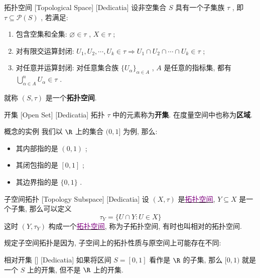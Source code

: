 \documentclass[UTF8]{ctexart}
\newcommand{\hyperrefc}[2]{\hyperref[#1]{\textcolor{purple}{#2}}}
\begin{document}
\begin{dfn}
    [TopologicalSpace]
    {拓扑空间}
    [Topological Space]
    [Dedicatia]
    设非空集合 \( S \) 具有一个子集族 \( \tau \) , 即 \( \tau\subseteq\mathcal{P}(S)  \) , 若满足: 
    \begin{enumerate}
        \item 包含空集和全集:  \( \varnothing\in\tau \) ,  \( X\in\tau \) ;
        \item 对有限交运算封闭:  \( U_1,U_2,\cdots,U_k\in\tau\Longrightarrow U_1\cap U_2\cap\cdots\cap U_k\in\tau    \) ;
        \item 对任意并运算封闭: 对任意集合族 \( \{U_\alpha\}_{\alpha\in A} \) ,  \( A \) 是任意的指标集, 都有 \( \bigcup_{\alpha\in A}^n U_\alpha\in\tau \) .
    \end{enumerate}
    就称 \( (S,\tau) \) 是一个\textbf{拓扑空间}. 
\end{dfn}
\begin{ppt}
    [UUID]
    {开集}
    [Open Set]
    [Dedicatia]
    拓扑 \( \tau \) 中的元素称为\textbf{开集}. 在度量空间中也称为\textbf{区域}. 
\end{ppt}
\begin{xmp}
    {概念的实例}
    我们以 \( \R \) 上的集合 \( (0,1] \) 为例, 那么: 
    \begin{itemize}
        \item 其内部指的是 \( (0,1) \) ;
        \item 其闭包指的是 \( [0,1] \) ;
        \item 其边界指的是 \( \{0,1\} \) .
    \end{itemize}
\end{xmp}
\begin{dfn}
    [UUID]
    {子空间拓扑}
    [Topology Subspace]
    [Dedicatia]
    设 \( (X,\tau) \) 是\hyperrefc{dfn:TopologicalSpace}{拓扑空间},  \( Y\subseteq X \) 是一个子集, 那么可以定义
    \[\tau_Y=\{U\cap Y:U\in X\}\]
    这时 \( (Y,\tau_Y ) \) 构成一个\hyperrefc{dfn:TopologicalSpace}{拓扑空间}, 称为子拓扑空间, 有时也叫相对的拓扑空间. 
\end{dfn}
规定子空间拓扑是因为, 子空间上的拓扑性质与原空间上可能存在不同: 
\begin{xmp}
    [UUID]
    {相对开集}
    []
    [Dedicatia]
    如果将区间 \( S=[0,1] \) 看作是 \( \R \) 的子集, 那么 \( [0,1) \) 就是一个 \( S \) 上的开集, 但不是 \( \R \) 上的开集. 
\end{xmp}
\end{document}
